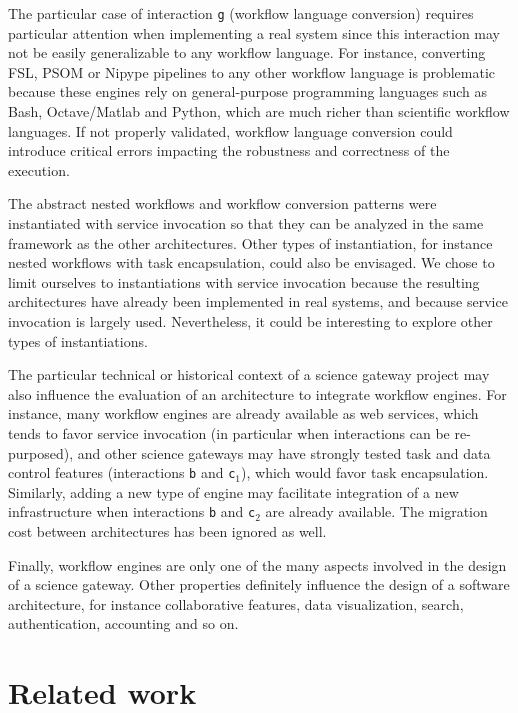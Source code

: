 \documentclass[preprint,3p,twocolumn]{elsarticle}
\newcommand{\correction}[1]{\color{blue}#1\color{black}\xspace}
\begin{document}
The particular case of interaction \texttt{g} (workflow language
conversion) requires particular attention when implementing a real
system since this interaction may not be easily generalizable to any
workflow language. For instance, converting FSL, PSOM or Nipype
pipelines to any other workflow language is problematic because these
engines rely on general-purpose programming languages such as Bash,
Octave/Matlab and Python, which are much richer than scientific
workflow languages. \correction{If not properly validated, workflow
  language conversion could introduce critical errors impacting the
  robustness and correctness of the execution. }

The abstract nested workflows and workflow conversion patterns were
instantiated with service invocation so that they can be analyzed in
the same framework as the other architectures. Other types of
instantiation, for instance nested workflows with task encapsulation,
could also be envisaged. We chose to limit ourselves to instantiations
with service invocation because the resulting architectures have already been
implemented in real systems, and because service invocation is largely
used. Nevertheless, it could be interesting to explore other types of
instantiations.

The particular technical or historical context of a science gateway
project may also influence the \correction{evaluation} of an
architecture to integrate workflow engines. For instance, many
workflow engines are already available as web services, which tends to
favor service invocation (\correction{in particular when interactions
  can be re-purposed}), and other science gateways may have strongly
tested task and data control features (interactions \texttt{b} and
\correction{\texttt{c$_1$}}), which would favor task
encapsulation. Similarly, adding a new type of engine may facilitate
integration of a new infrastructure when interactions \texttt{b} and
\texttt{c$_2$} are already available. The migration cost between
architectures has been ignored as well.

Finally, workflow engines are only one of the many aspects involved in
the design of a science gateway. Other properties definitely influence
the design of a software architecture, for instance collaborative
features, data visualization, search, authentication, accounting and
so on.

\section{Related work}
\label{sec:related}
 
\end{document}

